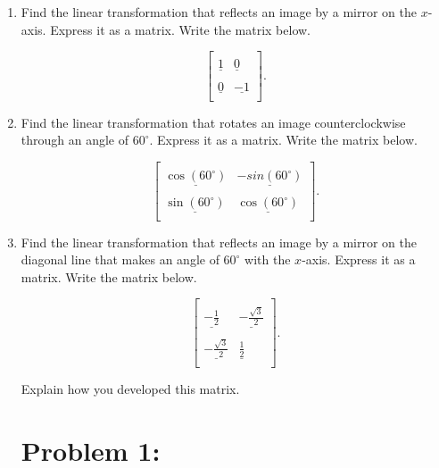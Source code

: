 \begin{enumerate}
    \item Find the linear transformation that reflects an image by a mirror on the $x$-axis.  Express it as a matrix.  Write the matrix below.

$$\left[{\begin{array}{cc}
\\
\underline{1} & \underline{0} \\
\\
\underline{0} & \underline{-1} \\
\end{array}}\right].$$


\vspace{.5in}



\item Find the linear transformation that rotates an image counterclockwise through an angle of $60^{\circ}$.  Express it as a matrix.  Write the matrix below.

$$\left[{\begin{array}{cc}
\\
\underline{\cos(60^{\circ})} & \underline{-sin(60^{\circ})} \\
\\
\underline{\sin(60^{\circ})} & \underline{\cos(60^{\circ})} \\
\end{array}}\right].$$

\vspace{.5in}


\item Find the linear transformation that reflects an image by a mirror on the diagonal line that makes an angle of $60^{\circ}$ with the $x$-axis.  Express it as a matrix.  Write the matrix below.

$$\left[{\begin{array}{cc}
\\
\underline{-\frac{1}{2}} & \underline{-\frac{\sqrt{3}}{2}} \\
\\
\underline{-\frac{\sqrt{3}}{2}} & \underline{\frac{1}{2}} \\
\end{array}}\right].$$

\vspace{8pt}


\noindent Explain how you developed this matrix.

\section*{Problem 1:}


\end{enumerate}
